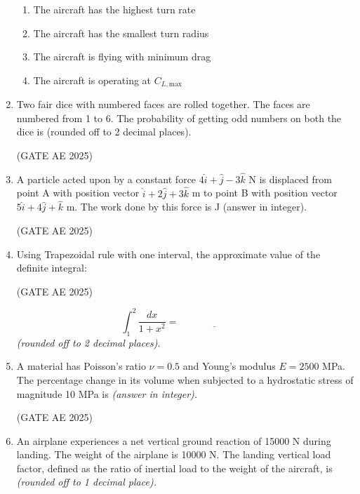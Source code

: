 \documentclass[journal,12pt,onecolumn]{IEEEtran}
\theoremstyle{remark}
\begin{document}
\begin{flushleft}
\begin{enumerate}
\begin{enumerate}
    \item The aircraft has the highest turn rate
    \item The aircraft has the smallest turn radius
    \item The aircraft is flying with minimum drag
    \item The aircraft is operating at $C_{L,\text{max}}$
\end{enumerate}

\item Two fair dice with numbered faces are rolled together. The faces are numbered from 1 to 6. The probability of getting odd numbers on both the dice is \underline{\hspace{3cm}} (rounded off to 2 decimal places).

\hfill (GATE AE 2025)

\item A particle acted upon by a constant force $4\hat{i} + \hat{j} - 3\hat{k}$ N is displaced from point A with position vector $\hat{i} + 2\hat{j} + 3\hat{k}$ m to point B with position vector $5\hat{i} + 4\hat{j} + \hat{k}$ m. The work done by this force is \underline{\hspace{3cm}} J (answer in integer).

\hfill (GATE AE 2025)

\item Using Trapezoidal rule with one interval, the approximate value of the definite integral:

\hfill (GATE AE 2025)

\[
\int_{1}^{2} \frac{dx}{1 + x^2}= \underline{\hspace{3cm}}\] 
\textit{(rounded off to 2 decimal places).}


\item A material has Poisson's ratio $\nu = 0.5$ and Young's modulus $E = 2500$ MPa. The percentage change in its volume when subjected to a hydrostatic stress of magnitude 10 MPa is \underline{\hspace{3cm}} \textit{(answer in integer).}

\hfill (GATE AE 2025)

\item An airplane experiences a net vertical ground reaction of 15000 N during landing. The weight of the airplane is 10000 N. The landing vertical load factor, defined as the ratio of inertial load to the weight of the aircraft, is \underline{\hspace{3cm}} \textit{(rounded off to 1 decimal place).}


\end{enumerate}
\end{flushleft}
\end{document}
